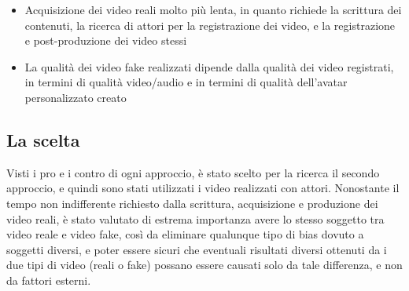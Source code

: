 \begin{itemize}
    \item Acquisizione dei video reali molto più lenta, in quanto richiede la scrittura dei contenuti, la ricerca di attori per la registrazione dei video, e la registrazione e post-produzione dei video stessi
    \item La qualità dei video fake realizzati dipende dalla qualità dei video registrati, in termini di qualità video/audio e in termini di qualità dell'avatar personalizzato creato
\end{itemize}

\subsection{La scelta}

Visti i pro e i contro di ogni approccio, è stato scelto per la ricerca il secondo approccio, e quindi sono stati utilizzati i video realizzati con attori. Nonostante il tempo non indifferente richiesto dalla scrittura, acquisizione e produzione dei video reali, è stato valutato di estrema importanza avere lo stesso soggetto tra video reale e video fake, così da eliminare qualunque tipo di bias dovuto a soggetti diversi, e poter essere sicuri che eventuali risultati diversi ottenuti da i due tipi di video  (reali o fake) possano essere causati solo da tale differenza, e non da fattori esterni.

\clearpage
